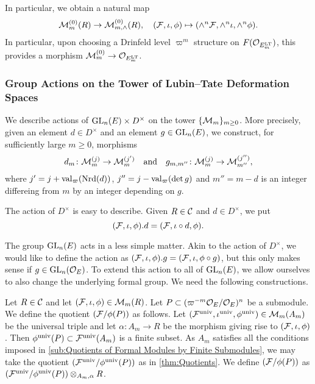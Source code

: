 \documentclass[../main.tex]{subfiles}
\begin{document}
In particular, we obtain a natural map
\begin{equation*}
  \mathcal{M}_m^{(0)}(R) \to \mathcal{M}^{(0)}_{m, \wedge}(R), \quad (\mathcal{F}, \iota, \phi)
  \mapsto (\wedge^n \mathcal{F}, \wedge^n \iota, \wedge^n \phi).
\end{equation*}
In particular, upon choosing a Drinfeld level $\varpi^m$ structure on 
$F(\mathcal{O}_{E^{\mathrm{LT}}_m})$, this provides a morphism $\mathcal{M}_m^{(0)} \to \mathcal{O}_{E^{\mathrm{LT}}_m}$. 


\subsubsection{Group Actions on the Tower of Lubin--Tate Deformation Spaces} %
\label{ssub:Group Actions on the Tower of Lubin--Tate Deformation Spaces}
We describe actions of $\operatorname{GL}_n(E) \times D^\times$ on the tower
$\{\mathcal{M}_m\}_{m \geq 0}$. More precisely, given an element $d \in D^\times$ and an element
$g \in \operatorname{GL}_n(E)$, we construct, for sufficiently large $m\geq 0$, morphisms
\begin{equation*}
  d_m \colon \mathcal{M}_m^{(j)} \to \mathcal{M}_m^{(j')} \quad \text{and} \quad
  g_{m,m''} \colon \mathcal{M}_m^{(j)} \to \mathcal{M}_{m''}^{(j'')},
\end{equation*}
where $j'= j+\mathrm{val}_\varpi(\operatorname{Nrd}(d))$, $j'' = j - \mathrm{val}_\varpi(\det g)$ and $m''
= m-d$ is an integer differeing from $m$ by an integer depending on $g$. 

The action of $D^\times$ is easy to describe. Given $R \in \mathcal{C}$ and 
$d \in D^\times$, we put
\begin{equation*}
  (\mathcal{F}, \iota, \phi).d = (\mathcal{F}, \iota \circ d, \phi).
\end{equation*}

The group $\operatorname{GL}_n(E)$ acts in a less simple matter. Akin to the action of
$D^\times$, we would like to define the action as
$(\mathcal{F}, \iota, \phi).g = (\mathcal{F}, \iota, \phi \circ g)$, but this only makes sense
if $g \in \operatorname{GL}_n(\mathcal{O}_E)$. To extend this action to all of $\operatorname{GL}_n(E)$, we
allow ourselves to also change the underlying formal group.
We need the following constructions.

\begin{defi}\label{def:QuotientModule}
  Let $R \in \mathcal{C}$ and let $(\mathcal{F}, \iota, \phi) \in \mathcal{M}_m(R)$. Let
  $P \subset (\varpi^{-m}\mathcal{O}_E/\mathcal{O}_E)^n$ be a submodule.
  We define the quotient $(\mathcal{F}/\phi(P))$ as follows. Let 
  $(\mathcal{F}^{\mathrm{univ}}, \iota^{\mathrm{univ}}, \phi^{{\mathrm{univ}}}) \in \mathcal{M}_m(A_m)$ be the universal 
  triple and let $\alpha\colon A_m \to R$ be the morphism giving rise to
  $(\mathcal{F}, \iota, \phi)$. Then $\phi^{\mathrm{univ}}(P) \subset \mathcal{F}^{\mathrm{univ}}(A_m)$ is a 
  finite subset. As $A_m$ satisfies all the conditions imposed in
  \cref{sub:Quotients of Formal Modules by Finite Submodules}, we may take the quotient
  $(\mathcal{F}^{\mathrm{univ}}/\phi^{\mathrm{univ}}(P))$ as in \cref{thm:Quotients}. We define
  $(\mathcal{F}/\phi(P))$ as $(\mathcal{F}^{\mathrm{univ}}/\phi^{\mathrm{univ}}(P))\otimes_{A_m,\alpha} R$. 
\end{defi}
\end{document}
